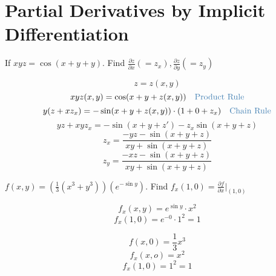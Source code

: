 \section{Partial Derivatives by Implicit Differentiation}
\begin{eg}
If \(xyz = \cos (x + y + y)\). Find \(\displaystyle \frac{\partial z}{\partial x}( = z_x), \frac{\partial z}{\partial y} (= z_y)\)

\soln
\[z = z(x, y)\]
\[xyz(x, y) = \cos (x + y + z(x, y)) \quad \tssteelblue{\text{Product Rule}}\]
\[y(z + xz_x) = - \sin (x + y + z(x, y)) \cdot (1 + 0 + z_x) \quad \tssteelblue{\text{Chain Rule}}\]
\[yz + xyz_x = - \sin (x + y + z') - z_x \sin (x + y + z)\]
\[\displaystyle z_x = \frac{-yz - \sin (x + y + z)}{xy + \sin (x + y + z)}\]
\[\displaystyle z_y = \frac{-xz - \sin (x + y + z)}{xy + \sin (x + y +z)}\]
\end{eg}
\begin{eg}
\(\displaystyle f(x, y) = (\frac{1}{3} (x^3 + y^3))(e^{- \sin y})\). Find \(\displaystyle f_x (1, 0) = \frac{\partial f}{\partial x} \Big|_{(1, 0)}\)

\[f_x(x, y) = e^{\sin y} \cdot x^2\]
\[f_x(1, 0) = e^{- 0} \cdot 1^2 = 1\]

\[f(x, 0) = \frac{1}{3} x^3\]
\[f_x(x, o) = x^2\]
\[f_x(1, 0) = 1^2 = 1\]
\end{eg}
